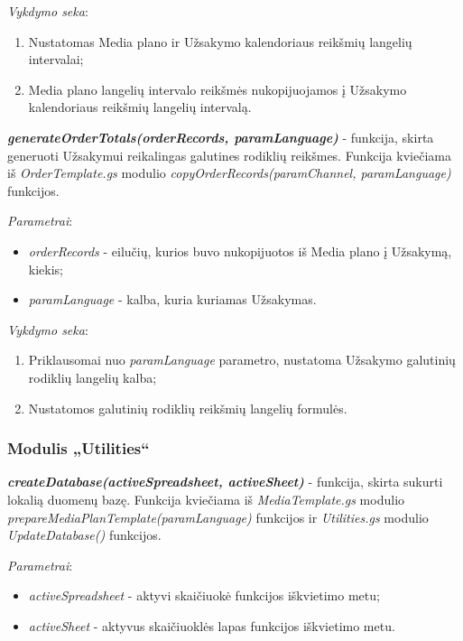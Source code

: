 \bigskip
\textit{Vykdymo seka}:
\begin{enumerate}
    \itemsep0em 
    \item Nustatomas Media plano ir Užsakymo kalendoriaus reikšmių langelių intervalai;
    \item Media plano langelių intervalo reikšmės nukopijuojamos į Užsakymo kalendoriaus reikšmių langelių intervalą.
\end{enumerate}

\bigskip
\textit{\textbf{generateOrderTotals(orderRecords, paramLanguage)}} - funkcija, skirta generuoti Užsakymui reikalingas galutines rodiklių reikšmes. Funkcija kviečiama iš \textit{OrderTemplate.gs} modulio \textit{copyOrderRecords(paramChannel, paramLanguage)} funkcijos.

\bigskip
\textit{Parametrai}:
\begin{itemize}
    \itemsep0em 
    \item \textit{orderRecords} - eilučių, kurios buvo nukopijuotos iš Media plano į Užsakymą, kiekis;
    \item \textit{paramLanguage} - kalba, kuria kuriamas Užsakymas.
\end{itemize}

\bigskip
\textit{Vykdymo seka}:
\begin{enumerate}
    \itemsep0em 
    \item Priklausomai nuo \textit{paramLanguage} parametro, nustatoma Užsakymo galutinių rodiklių langelių kalba;
    \item Nustatomos galutinių rodiklių reikšmių langelių formulės.
\end{enumerate}



\subsubsection{Modulis „Utilities“}

\textit{\textbf{createDatabase(activeSpreadsheet, activeSheet)}} - funkcija, skirta sukurti lokalią duomenų bazę. Funkcija kviečiama iš \textit{MediaTemplate.gs} modulio \textit{prepareMediaPlanTemplate(paramLanguage)} funkcijos ir \textit{Utilities.gs} modulio \textit{UpdateDatabase()} funkcijos.

\bigskip
\textit{Parametrai}:
\begin{itemize}
    \itemsep0em 
    \item \textit{activeSpreadsheet} - aktyvi skaičiuokė funkcijos iškvietimo metu;
    \item \textit{activeSheet} - aktyvus skaičiuoklės lapas funkcijos iškvietimo metu.
\end{itemize}

